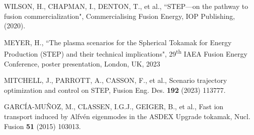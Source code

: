 \documentclass[10pt, a4paper, twoside]{article}
\begin{document}
\fontsize{9}{12}\selectfont
\setlength{\parskip}{0pt}
\begin{thebibliography}{9}

    WILSON, H., CHAPMAN, I., DENTON, T., et al., 
    ``STEP---on the pathway to fusion commercialization", 
    Commercialising Fusion Energy, 
    IOP Publishing, 
    (2020).

    MEYER, H.,
    ``The plasma scenarios for the Spherical Tokamak for Energy Production (STEP) and their technical implications",
    29\textsuperscript{th} IAEA Fusion Energy Conference,
    poster presentation, 
    London, UK, 
    2023


    MITCHELL, J., PARROTT, A., CASSON, F., et al.,
    Scenario trajectory optimization and control on STEP,
    Fusion Eng. Des.
    \textbf{192} 
    (2023) 
    113777.


    GARC\'IA-MU\~NOZ, M., CLASSEN, I.G.J., GEIGER, B., et al., 
    Fast ion transport induced by Alfv\'en eigenmodes in the ASDEX Upgrade tokamak, 
    Nucl. Fusion 
    \textbf{51} 
    (2015) 
    103013.


\end{thebibliography}
\end{document}
